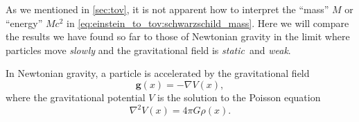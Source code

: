 As we mentioned in \cref{sec:tov}, it is not apparent how to interpret the ``mass'' $M$ or ``energy'' $Mc^2$ in \cref{eq:einstein_to_tov:schwarzschild_mass}.
Here we will compare the results we have found so far to those of Newtonian gravity in the limit where particles move \emph{slowly} and the gravitational field is \emph{static} and \emph{weak}.

In Newtonian gravity, a particle is accelerated by the gravitational field
\begin{equation}
	\mathbf{g}(x) = - \nabla V(x) ,
	\label{eq:interpretation_m:newton2}
\end{equation}
where the gravitational potential $V$ is the solution to the Poisson equation
\begin{equation}
	\nabla^2 V(x) = 4 \pi G \rho(x) .
	\label{eq:interpretation_m:poisson}
\end{equation}

